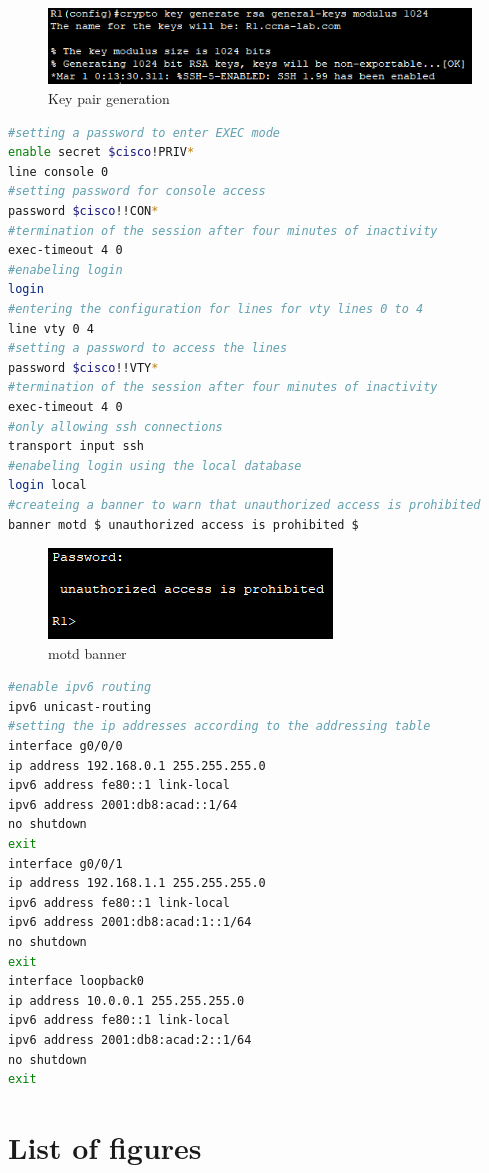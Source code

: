 \documentclass[a4paper]{article}
\newcommand{\abc}{\hfill \break}
\begin{document}
\begin{figure}[h]
	\includegraphics[scale=0.55]{images/keygen.png}
	\centering
	\caption{Key pair generation}
\end{figure}
\begin{lstlisting}[language=bash,
	keywordstyle=\color{black},
	rulecolor=\color{blue}]
#setting a password to enter EXEC mode
enable secret $cisco!PRIV*
line console 0
#setting password for console access
password $cisco!!CON*
#termination of the session after four minutes of inactivity
exec-timeout 4 0
#enabeling login 
login
#entering the configuration for lines for vty lines 0 to 4
line vty 0 4
#setting a password to access the lines
password $cisco!!VTY*
#termination of the session after four minutes of inactivity
exec-timeout 4 0
#only allowing ssh connections
transport input ssh
#enabeling login using the local database
login local
#createing a banner to warn that unauthorized access is prohibited
banner motd $ unauthorized access is prohibited $
\end{lstlisting}
\begin{figure}[h]
	\includegraphics[scale=0.55]{images/banner.png}
	\centering
	\caption{motd banner}
\end{figure}\abc

\begin{lstlisting}[language=bash,
	keywordstyle=\color{black},
	rulecolor=\color{blue}]
#enable ipv6 routing
ipv6 unicast-routing
#setting the ip addresses according to the addressing table
interface g0/0/0
ip address 192.168.0.1 255.255.255.0
ipv6 address fe80::1 link-local
ipv6 address 2001:db8:acad::1/64
no shutdown
exit
interface g0/0/1
ip address 192.168.1.1 255.255.255.0
ipv6 address fe80::1 link-local
ipv6 address 2001:db8:acad:1::1/64
no shutdown
exit
interface loopback0
ip address 10.0.0.1 255.255.255.0
ipv6 address fe80::1 link-local
ipv6 address 2001:db8:acad:2::1/64
no shutdown
exit
\end{lstlisting}



\newpage
\section{List of figures}

\listoffigures
\end{document}
